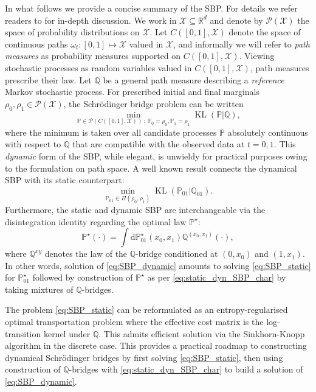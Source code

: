 \documentclass{article}
\newcommand{\diff}{\mathrm{d}}
\newcommand{\Xc}{\mathcal{X}}
\newcommand{\Pc}{\mathcal{P}}
\newcommand{\KL}{\operatorname{KL}}
\theoremstyle{newstyle}
\begin{document}
In what follows we provide a concise summary of the SBP. For details we refer readers to \cite{leonard2013survey, chen2021stochastic} for in-depth discussion. We work in $\Xc \subseteq \mathbb{R}^d$ and denote by $\Pc(\Xc)$ the space of probability distributions on $\Xc$. Let $C([0, 1], \Xc)$ denote the space of continuous paths $\omega_t : [0, 1] \mapsto \Xc$ valued in $\Xc$, and informally we will refer to \emph{path measures} as probability measures supported on $C([0, 1], \Xc)$. Viewing stochastic processes as random variables valued in $C([0, 1], \Xc)$, path measures prescribe their law. 
Let $\mathbb{Q}$ be a general path measure describing a \emph{reference} Markov stochastic process. For prescribed initial and final marginals $\rho_0, \rho_1 \in \Pc(\Xc)$, the Schr\"odinger bridge problem can be written
\begin{equation}
  \min_{\mathbb{P} \in \Pc(C([0, 1], \Xc)) \: : \: \mathbb{P}_{0} = \rho_{0}, \mathbb{P}_1 = \rho_{1}} \KL(\mathbb{P} | \mathbb{Q}),  \label{eq:SBP_dynamic} \tag{SBP-dyn}
\end{equation}
where the minimum is taken over all candidate processes $\mathbb{P}$ absolutely continuous with respect to $\mathbb{Q}$ that are compatible with the observed data at $t = 0, 1$. This \emph{dynamic} form of the SBP, while elegant, is unwieldy for practical purposes owing to the formulation on path space. A well known result \cite{leonard2013survey} connects the dynamical SBP with its static counterpart:
\begin{equation}
  \min_{\mathbb{P}_{01} \in \Pi(\rho_0, \rho_1)} \KL( \mathbb{P}_{01} | \mathbb{Q}_{01}).  \label{eq:SBP_static} \tag{SBP-static}
\end{equation}
Furthermore, the static and dynamic SBP are interchangeable via the disintegration identity regarding the optimal law $\mathbb{P}^\star$:
\begin{equation}
  \mathbb{P}^\star(\cdot) = \int \diff \mathbb{P}^\star_{01} (x_0, x_1) \mathbb{Q}^{(x_0, x_1)}(\cdot), \label{eq:static_dyn_SBP_char} 
\end{equation}
where $\mathbb{Q}^{xy}$ denotes the law of the $\mathbb{Q}$-bridge conditioned at $(0, x_0)$ and $(1, x_1)$. In other words, solution of \eqref{eq:SBP_dynamic} amounts to solving \eqref{eq:SBP_static} for $\mathbb{P}_{01}^\star$ followed by construction of $\mathbb{P}^\star$ as per \eqref{eq:static_dyn_SBP_char} by taking mixtures of $\mathbb{Q}$-bridges.

The problem \eqref{eq:SBP_static} can be reformulated as an entropy-regularised optimal transportation problem \cite{chen2021stochastic} where the effective cost matrix is the log-transition kernel under $\mathbb{Q}$. This admits efficient solution via the Sinkhorn-Knopp algorithm \cite{cuturi2013sinkhorn} in the discrete case. This provides a practical roadmap to constructing dynamical Schr\"odinger bridges by first solving \eqref{eq:SBP_static}, then using construction of $\mathbb{Q}$-bridges with \eqref{eq:static_dyn_SBP_char} to build a solution of \eqref{eq:SBP_dynamic}.
\end{document}
